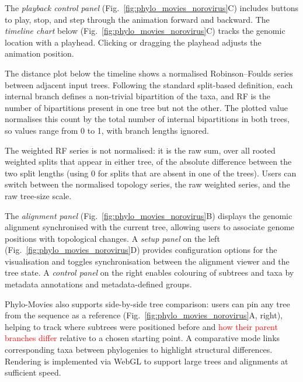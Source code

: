 The \textit{playback control panel} (Fig.~\ref{fig:phylo_movies_norovirus}C) includes buttons to play, stop, and step through the animation forward and backward. The \textit{timeline chart} below (Fig.~\ref{fig:phylo_movies_norovirus}C) tracks the genomic location with a playhead. Clicking or dragging the playhead adjusts the animation position. 

The distance plot below the timeline shows a normalised Robinson--Foulds series \citep[RF;][]{ROBINSON1981131,RobinsonFoulds2006} between adjacent input trees. Following the standard split-based definition, each internal branch defines a non-trivial bipartition of the taxa, and RF is the number of bipartitions present in one tree but not the other. The plotted value normalises this count by the total number of internal bipartitions in both trees, so values range from 0 to 1, with branch lengths ignored.

The weighted RF series is not normalised: it is the raw sum, over all rooted weighted splits that appear in either tree, of the absolute difference between the two split lengths (using 0 for splits that are absent in one of the trees). Users can switch between the normalised topology series, the raw weighted series, and the raw tree-size scale.

The \textit{alignment panel} (Fig.~\ref{fig:phylo_movies_norovirus}B) displays the genomic alignment synchronised with the current tree, allowing users to associate genome positions with topological changes. A \textit{setup panel} on the left (Fig.~\ref{fig:phylo_movies_norovirus}D) provides configuration options for the visualisation and toggles synchronisation between the alignment viewer and the tree state. A \textit{control panel} on the right enables colouring of subtrees and taxa by metadata annotations and metadata-defined groups.

Phylo-Movies also supports side-by-side tree comparison: users can pin any tree from the sequence as a reference (Fig.~\ref{fig:phylo_movies_norovirus}A, right), helping to track where subtrees were positioned before and \textcolor{red}{how their parent branches differ} relative to a chosen starting point. A comparative mode links corresponding taxa between phylogenies to highlight structural differences. Rendering is implemented via WebGL to support large trees and alignments at sufficient speed.

